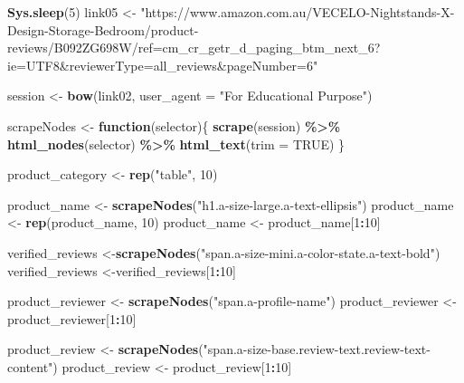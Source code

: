 \documentclass[
]{article}
\newenvironment{Shaded}{\begin{snugshade}}{\end{snugshade}}
\newcommand{\AttributeTok}[1]{\textcolor[rgb]{0.13,0.29,0.53}{#1}}
\newcommand{\ConstantTok}[1]{\textcolor[rgb]{0.56,0.35,0.01}{#1}}
\newcommand{\ControlFlowTok}[1]{\textcolor[rgb]{0.13,0.29,0.53}{\textbf{#1}}}
\newcommand{\DecValTok}[1]{\textcolor[rgb]{0.00,0.00,0.81}{#1}}
\newcommand{\FunctionTok}[1]{\textcolor[rgb]{0.13,0.29,0.53}{\textbf{#1}}}
\newcommand{\NormalTok}[1]{#1}
\newcommand{\OtherTok}[1]{\textcolor[rgb]{0.56,0.35,0.01}{#1}}
\newcommand{\SpecialCharTok}[1]{\textcolor[rgb]{0.81,0.36,0.00}{\textbf{#1}}}
\newcommand{\StringTok}[1]{\textcolor[rgb]{0.31,0.60,0.02}{#1}}
\begin{document}
\begin{Shaded}
\begin{Highlighting}[]
   \FunctionTok{Sys.sleep}\NormalTok{(}\DecValTok{5}\NormalTok{)}
\NormalTok{link05 }\OtherTok{\textless{}{-}} \StringTok{"https://www.amazon.com.au/VECELO{-}Nightstands{-}X{-}Design{-}Storage{-}Bedroom/product{-}reviews/B092ZG698W/ref=cm\_cr\_getr\_d\_paging\_btm\_next\_6?ie=UTF8\&reviewerType=all\_reviews\&pageNumber=6"}


\NormalTok{  session }\OtherTok{\textless{}{-}} \FunctionTok{bow}\NormalTok{(link02,}
               \AttributeTok{user\_agent =} \StringTok{"For Educational Purpose"}\NormalTok{)}

\NormalTok{  scrapeNodes }\OtherTok{\textless{}{-}} \ControlFlowTok{function}\NormalTok{(selector)\{}
    \FunctionTok{scrape}\NormalTok{(session) }\SpecialCharTok{\%\textgreater{}\%}
      \FunctionTok{html\_nodes}\NormalTok{(selector) }\SpecialCharTok{\%\textgreater{}\%}
      \FunctionTok{html\_text}\NormalTok{(}\AttributeTok{trim =} \ConstantTok{TRUE}\NormalTok{)}
\NormalTok{  \}}

\NormalTok{  product\_category }\OtherTok{\textless{}{-}} \FunctionTok{rep}\NormalTok{(}\StringTok{"table"}\NormalTok{, }\DecValTok{10}\NormalTok{)}

\NormalTok{  product\_name }\OtherTok{\textless{}{-}} \FunctionTok{scrapeNodes}\NormalTok{(}\StringTok{"h1.a{-}size{-}large.a{-}text{-}ellipsis"}\NormalTok{)}
\NormalTok{  product\_name }\OtherTok{\textless{}{-}} \FunctionTok{rep}\NormalTok{(product\_name, }\DecValTok{10}\NormalTok{)}
\NormalTok{  product\_name }\OtherTok{\textless{}{-}}\NormalTok{ product\_name[}\DecValTok{1}\SpecialCharTok{:}\DecValTok{10}\NormalTok{]}
  
\NormalTok{  verified\_reviews }\OtherTok{\textless{}{-}}\FunctionTok{scrapeNodes}\NormalTok{(}\StringTok{"span.a{-}size{-}mini.a{-}color{-}state.a{-}text{-}bold"}\NormalTok{)}
\NormalTok{  verified\_reviews }\OtherTok{\textless{}{-}}\NormalTok{verified\_reviews[}\DecValTok{1}\SpecialCharTok{:}\DecValTok{10}\NormalTok{]}
  
\NormalTok{  product\_reviewer }\OtherTok{\textless{}{-}} \FunctionTok{scrapeNodes}\NormalTok{(}\StringTok{"span.a{-}profile{-}name"}\NormalTok{)}
\NormalTok{  product\_reviewer }\OtherTok{\textless{}{-}}\NormalTok{ product\_reviewer[}\DecValTok{1}\SpecialCharTok{:}\DecValTok{10}\NormalTok{]}
  
\NormalTok{  product\_review }\OtherTok{\textless{}{-}} \FunctionTok{scrapeNodes}\NormalTok{(}\StringTok{"span.a{-}size{-}base.review{-}text.review{-}text{-}content"}\NormalTok{)}
\NormalTok{  product\_review }\OtherTok{\textless{}{-}}\NormalTok{ product\_review[}\DecValTok{1}\SpecialCharTok{:}\DecValTok{10}\NormalTok{]}
  

\end{Highlighting}
\end{Shaded}
\end{document}
